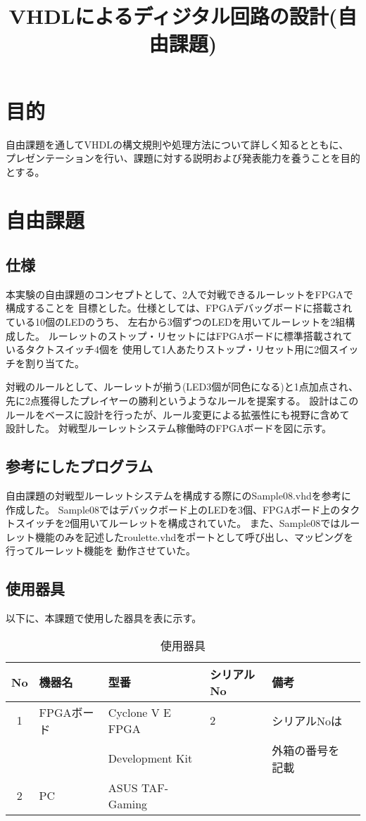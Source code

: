 \documentclass{ltjsarticle}
\title{VHDLによるディジタル回路の設計(自由課題)}
\begin{document}
\maketitle

\section{目的}
	自由課題を通してVHDLの構文規則や処理方法について詳しく知るとともに、
	プレゼンテーションを行い、課題に対する説明および発表能力を養うことを目的とする。
\section{自由課題}
	\subsection{仕様}
		本実験の自由課題のコンセプトとして、2人で対戦できるルーレットをFPGAで構成することを
		目標とした。仕様としては、FPGAデバッグボードに搭載されている10個のLEDのうち、
		左右から3個ずつのLEDを用いてルーレットを2組構成した。
		ルーレットのストップ・リセットにはFPGAボードに標準搭載されているタクトスイッチ4個を
		使用して1人あたりストップ・リセット用に2個スイッチを割り当てた。

		対戦のルールとして、ルーレットが揃う(LED3個が同色になる)と1点加点され、
		先に2点獲得したプレイヤーの勝利というようなルールを提案する。
		設計はこのルールをベースに設計を行ったが、ルール変更による拡張性にも視野に含めて
		設計した。
		対戦型ルーレットシステム稼働時のFPGAボードを図に示す。
	\subsection{参考にしたプログラム}
		自由課題の対戦型ルーレットシステムを構成する際に\cite{ref:指導書}のSample08.vhdを参考に作成した。
		Sample08ではデバックボード上のLEDを3個、FPGAボード上のタクトスイッチを2個用いてルーレットを構成されていた。
		また、Sample08ではルーレット機能のみを記述したroulette.vhdをポートとして呼び出し、マッピングを行ってルーレット機能を
		動作させていた。

	\subsection{使用器具}
		以下に、本課題で使用した器具を表に示す。
	\begin{table}[H]
	\begin{center}
	\caption{使用器具}
	\label{tab:used}
	\begin{tabular}{clllll} \toprule
	No&\multicolumn{1}{l}{機器名}&\multicolumn{1}{l}{型番}&\multicolumn{1}{l}{シリアルNo}&\multicolumn{1}{l}{備考}\\ \hline
	1&FPGAボード&Cyclone V E FPGA&2&シリアルNoは\\
	&&Development Kit&&外箱の番号を記載\\
	2&PC&ASUS TAF-Gaming&&\\
	\bottomrule
	\end{tabular}
	\end{center}
	\end{table}
\end{document}
